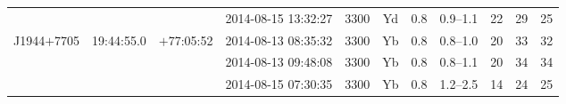 \begin{table*}
\begin{center}
{\begin{tabular}{lcccccccccc}
             &            &                & 2014-08-15 13:32:27   & 3300     & Yd      & 0.8      & 0.9--1.1 & 22        & 29        & 25          \\
J1944$+$7705 & 19:44:55.0 & $+$77:05:52    & 2014-08-13 08:35:32   & 3300     & Yb      & 0.8      & 0.8--1.0 & 20        & 33        & 32          \\
             &            &                & 2014-08-13 09:48:08   & 3300     & Yb      & 0.8      & 0.8--1.1 & 20        & 34        & 34          \\
             &            &                & 2014-08-15 07:30:35   & 3300     & Yb      & 0.8      & 1.2--2.5 & 14        & 24        & 25          \\
\hline
\end{tabular}
}
\begin{minipage}{\textwidth}
\end{minipage}
\end{center}
\end{table*}
